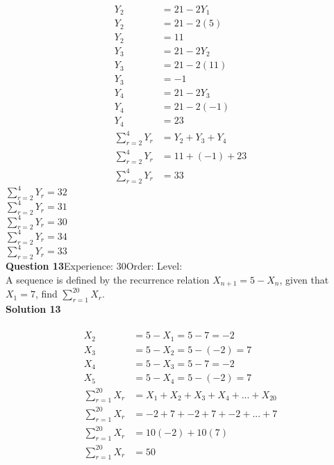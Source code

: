 \documentclass{article}
\begin{document}
\\[-10pt]\begin{align*}
Y_2&=21-2Y_1\\[2pt]
Y_2&=21-2(5)\\[2pt]
Y_2&=11\\[12pt]
Y_3&=21-2Y_2\\[2pt]
Y_3&=21-2(11)\\[2pt]
Y_3&=-1\\[12pt]
Y_4&=21-2Y_3\\[2pt]
Y_4&=21-2(-1)\\[2pt]
Y_4&=23\\[12pt]
\displaystyle\sum_{r=2}^{4} Y_r&=Y_2+Y_3+Y_4\\[2pt]
\displaystyle\sum_{r=2}^{4} Y_r&=11+(-1)+23\\[2pt]
\displaystyle\sum_{r=2}^{4} Y_r&=33
\end{align*}
$\displaystyle\sum_{r=2}^{4} Y_r=32$\\
$\displaystyle\sum_{r=2}^{4} Y_r=31$\\
$\displaystyle\sum_{r=2}^{4} Y_r=30$\\
$\displaystyle\sum_{r=2}^{4} Y_r=34$\\
$\displaystyle\sum_{r=2}^{4} Y_r=33$\\
\noindent\textbf{Question 13}\hspace{20pt}Experience: 30\hspace{20pt}Order: \hspace{20pt}Level: \\[2pt]
A sequence is defined by the recurrence relation $X_{n+1}=5-X_n$, given that  $X_1 =7$, find $\displaystyle\sum_{r=1}^{20} X_r$.\\[4pt]
\noindent\textbf{Solution 13}\\[2pt]
\\[-10pt]\begin{align*}
X_2&=5-X_1=5-7=-2\\[7pt]
X_3&=5-X_2=5-(-2)=7\\[7pt]
X_4&=5-X_3=5-7=-2\\[7pt]
X_5&=5-X_4=5-(-2)=7\\[7pt]
\displaystyle\sum_{r=1}^{20} X_r &= X_1+X_2+X_3+X_4+...+X_{20}\\[2pt]
\displaystyle\sum_{r=1}^{20} X_r &= -2+7+-2+7+-2+...+7\\[2pt]
\displaystyle\sum_{r=1}^{20} X_r &= 10(-2)+10(7)\\[2pt]
\displaystyle\sum_{r=1}^{20} X_r &= 50\\[2pt]
\end{align*}
\end{document}
